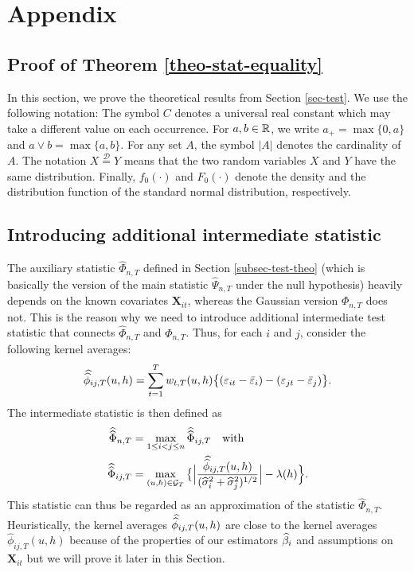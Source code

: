 \documentclass[a4paper,12pt]{article}
\newcommand{\doublehat}[1]{\skew{5.5}\widehat{\widehat{#1}}}
\newcommand{\doublehattwo}[1]{\widehat{\widehat{#1}}}
\begin{document}
\section{Appendix}\label{sec-appendix}

\subsection{Proof of Theorem \ref{theo-stat-equality}}\label{subsec-appendix-stat-equaility}


In this section, we prove the theoretical results from Section \ref{sec-test}. We use the following notation: The symbol $C$ denotes a universal real constant which may take a different value on each occurrence. For $a,b \in \mathbb{R}$, we write $a_+ = \max \{0,a\}$ and $a \vee b = \max\{a,b\}$. For any set $A$, the symbol $|A|$ denotes the cardinality of $A$. The notation $X \stackrel{\mathcal{D}}{=} Y$ means that the two random variables $X$ and $Y$ have the same distribution. Finally, $f_0(\cdot)$ and $F_0(\cdot)$ denote the density and the distribution function of the standard normal distribution, respectively.

\subsection*{Introducing additional intermediate statistic}

The auxiliary statistic $\widehat{\Phi}_{n,T}$ defined in Section \ref{subsec-test-theo} (which is basically the version of the main statistic $\widehat{\Psi}_{n,T}$ under the null hypothesis) heavily depends on the known covariates $\mathbf{X}_{it}$, whereas the Gaussian version $\Phi_{n,T}$ does not. This is the reason why we need to introduce additional intermediate test statistic that connects  $\widehat{\Phi}_{n,T}$ and $\Phi_{n,T}$. Thus, for each $i$ and $j$, consider the following kernel averages:
\[\doublehat{\phi}_{ij,T}(u,h) = \sum_{t=1}^T w_{t,T}(u,h) \big\{ (\varepsilon_{it} - \bar{\varepsilon}_i) - (\varepsilon_{jt} - \bar{\varepsilon}_j)  \big\}. \]
The intermediate statistic is then defined as 
\begin{align}\label{Phi-doublehat-statistic}
\doublehattwo{\Phi}_{n,T} &= \max_{1 \le i < j \le n} \doublehattwo{\Phi}_{ij,T}\quad  \text{with} \\
\doublehattwo{\Phi}_{ij,T} &= \max_{(u,h) \in \mathcal{G}_T} \big\{ \Big|\frac{\doublehat{\phi}_{ij,T}(u,h)}{(\widehat{\sigma}_i^2 + \widehat{\sigma}_j^2)^{1/2}}\Big| - \lambda(h) \Big\}.\nonumber
\end{align}
This statistic can thus be regarded as an approximation of the statistic $\widehat{\Phi}_{n,T}$. Heuristically, the kernel averages $\doublehat{\phi}_{ij,T}(u,h)$
are close to the kernel averages $\widehat{\phi}_{ij,T}(u,h)$ because of the properties of our estimators $\widehat{\bf{\beta}}_i$ and assumptions on $\mathbf{X}_{it}$ but we will prove it later in this Section.
\end{document}
